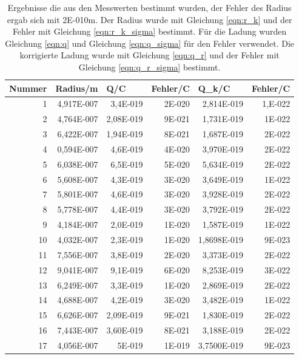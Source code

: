 \documentclass[12pt]{scrartcl}
\begin{document}
\begin{table}[H]
\caption{Ergebnisse die aus den Messwerten bestimmt wurden, der Fehler des Radius ergab sich mit 2E-010m. Der Radius wurde mit Gleichung \ref{eqn:r_k} und der Fehler mit Gleichung \ref{eqn:r_k_sigma} bestimmt. Für die Ladung wurden Gleichung \ref{eqn:q} und Gleichung \ref{eqn:q_sigma} für den Fehler verwendet. Die korrigierte Ladung wurde mit Gleichung \ref{eqn:q_r} und der Fehler mit Gleichung \ref{eqn:q_r_sigma} bestimmt.}
\begin{center}
\begin{tabular}{|r|r|r|r|r|r|}
\hline
\multicolumn{1}{|l|}{Nummer} & \multicolumn{1}{|l|}{Radius/m} & \multicolumn{1}{l|}{Q/C} & \multicolumn{1}{l|}{Fehler/C} & \multicolumn{1}{l|}{Q\_k/C} & \multicolumn{1}{l|}{Fehler/C} \\ \hline
1 & 4,917E-007 & 3,4E-019 & 2E-020 & 2,814E-019 & 1,E-022 \\ \hline
2 & 4,764E-007 & 2,08E-019 & 9E-021 & 1,731E-019 & 1E-022 \\ \hline
3 & 6,422E-007 & 1,94E-019 & 8E-021 & 1,687E-019 & 2E-022 \\ \hline
4 & 0,594E-007 & 4,6E-019 & 4E-020 & 3,970E-019 & 2E-022 \\ \hline
5 & 6,038E-007 & 6,5E-019 & 5E-020 & 5,634E-019 & 2E-022 \\ \hline
6 & 5,608E-007 & 4,3E-019 & 3E-020 & 3,649E-019 & 1E-022 \\ \hline
7 & 5,801E-007 & 4,6E-019 & 3E-020 & 3,928E-019 & 2E-022 \\ \hline
8 & 5,778E-007 & 4,4E-019 & 3E-020 & 3,792E-019 & 2E-022 \\ \hline
9 & 4,184E-007 & 2,0E-019 & 1E-020 & 1,587E-019 & 1E-022 \\ \hline
10 & 4,032E-007 & 2,3E-019 & 1E-020 & 1,8698E-019 & 9E-023 \\ \hline
11 & 7,556E-007 & 3,8E-019 & 2E-020 & 3,373E-019 & 2E-022 \\ \hline
12 & 9,041E-007 & 9,1E-019 & 6E-020 & 8,253E-019 & 3E-022 \\ \hline
13 & 6,249E-007 & 3,3E-019 & 1E-020 & 2,869E-019 & 2E-022 \\ \hline
14 & 4,688E-007 & 4,2E-019 & 3E-020 & 3,482E-019 & 1E-022 \\ \hline
15 & 6,626E-007 & 2,09E-019 & 9E-021 & 1,830E-019 & 2E-022 \\ \hline
16 & 7,443E-007 & 3,60E-019 & 8E-021 & 3,188E-019 & 2E-022 \\ \hline
17 & 4,056E-007 & 5E-019 & 1E-019 & 3,7500E-019 & 9E-023 \\ \hline

\end{tabular}
\end{center}
\end{table}
\end{document}

